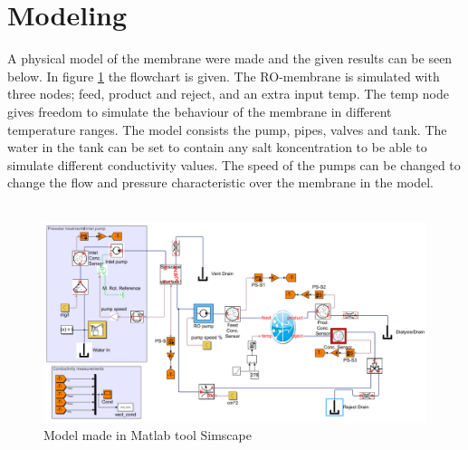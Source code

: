 \section{Modeling}
\label{sec:modres}
A physical model of the membrane were made and the given results can be seen below. In figure \ref{fig:simscape} the flowchart is given. The RO-membrane is simulated with three nodes; feed, product and reject, and an extra input temp. The temp node gives freedom to simulate the behaviour of the membrane in different temperature ranges. The model consists the pump, pipes, valves and tank. The water in the tank can be set to contain any salt koncentration to be able to simulate different conductivity values. The speed of the pumps can be changed to change the flow and pressure characteristic over the membrane in the model.\\
\\
\begin{figure}[h]
\label{fig:simscape}
\centering
\includegraphics[width=\textwidth]{simscape_fc1.PNG}
\caption{Model made in Matlab tool Simscape}
\end{figure}


